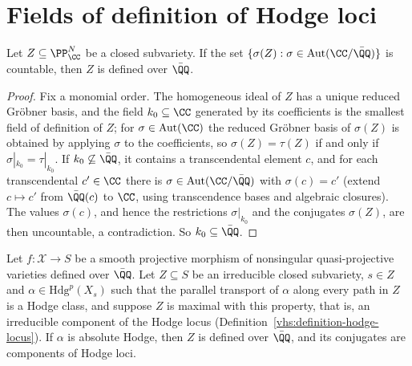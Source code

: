 \section{Fields of definition of Hodge loci}\label{absolute-hodge:section-hodge-loci}

\begin{lemma}\label{absolute-hodge:lemma-countable-conjugates}
Let $Z \subseteq \PP^N_\CC$ be a closed subvariety. If the set $\{\sigma(Z) : \sigma \in \mathrm{Aut}(\CC/\bar{\QQ})\}$ is countable, then $Z$ is defined over $\bar{\QQ}$.
\end{lemma}

\begin{proof}
Fix a monomial order. The homogeneous ideal of $Z$ has a unique reduced Gr\"obner basis, and the field $k_0 \subseteq \CC$ generated by its coefficients is the smallest field of definition of $Z$; for
$\sigma \in \mathrm{Aut}(\CC)$ the reduced Gr\"obner basis of $\sigma(Z)$ is obtained by applying $\sigma$ to the coefficients, so $\sigma(Z) = \tau(Z)$ if and only if $\sigma|_{k_0} = \tau|_{k_0}$. If $k_0 \not\subseteq \bar{\QQ}$,
it contains a transcendental element $c$, and for each transcendental $c' \in \CC$ there is $\sigma \in \mathrm{Aut}(\CC/\bar{\QQ})$ with $\sigma(c) = c'$ (extend $c \mapsto c'$ from $\bar{\QQ}(c)$ to $\CC$, using transcendence
bases and algebraic closures). The values $\sigma(c)$, and hence the restrictions $\sigma|_{k_0}$ and the conjugates $\sigma(Z)$, are then uncountable, a contradiction. So $k_0 \subseteq \bar{\QQ}$.
\end{proof}

\begin{proposition}[Voisin]\label{absolute-hodge:proposition-voisin}
Let $f \colon \mathcal{X} \to S$ be a smooth projective morphism of nonsingular quasi-projective varieties defined over $\bar{\QQ}$. Let $Z \subseteq S$ be an irreducible closed subvariety, $s \in Z$ and
$\alpha \in \mathrm{Hdg}^p(X_s)$ such that the parallel transport of $\alpha$ along every path in $Z$ is a Hodge class, and suppose $Z$ is maximal with this property, that is, an irreducible component of the Hodge
locus (Definition~\ref{vhs:definition-hodge-locus}). If $\alpha$ is absolute Hodge, then $Z$ is defined over $\bar{\QQ}$, and its conjugates are components of Hodge loci.
\end{proposition}

